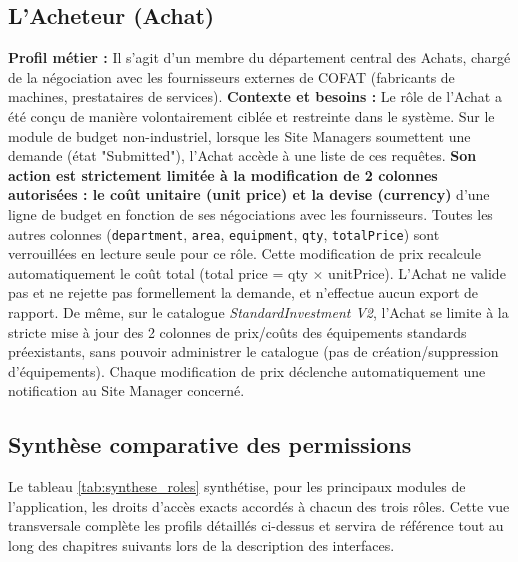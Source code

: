 \subsection{L'Acheteur (Achat)}
\textbf{Profil métier :} Il s'agit d'un membre du département central des Achats, chargé de la négociation avec les fournisseurs externes de COFAT (fabricants de machines, prestataires de services).
\newline
\textbf{Contexte et besoins :} Le rôle de l'Achat a été conçu de manière volontairement ciblée et restreinte dans le système. Sur le module de budget non-industriel, lorsque les Site Managers soumettent une demande (état "Submitted"), l'Achat accède à une liste de ces requêtes. \textbf{Son action est strictement limitée à la modification de 2 colonnes autorisées : le coût unitaire (unit price) et la devise (currency)} d'une ligne de budget en fonction de ses négociations avec les fournisseurs. Toutes les autres colonnes (\texttt{department}, \texttt{area}, \texttt{equipment}, \texttt{qty}, \texttt{totalPrice}) sont verrouillées en lecture seule pour ce rôle. Cette modification de prix recalcule automatiquement le coût total (total price = qty $\times$ unitPrice). L'Achat ne valide pas et ne rejette pas formellement la demande, et n'effectue aucun export de rapport. De même, sur le catalogue \textit{StandardInvestment V2}, l'Achat se limite à la stricte mise à jour des 2 colonnes de prix/coûts des équipements standards préexistants, sans pouvoir administrer le catalogue (pas de création/suppression d'équipements). Chaque modification de prix déclenche automatiquement une notification au Site Manager concerné.

\subsection{Synthèse comparative des permissions}
Le tableau \ref{tab:synthese_roles} synthétise, pour les principaux modules de l'application, les droits d'accès exacts accordés à chacun des trois rôles. Cette vue transversale complète les profils détaillés ci-dessus et servira de référence tout au long des chapitres suivants lors de la description des interfaces.

